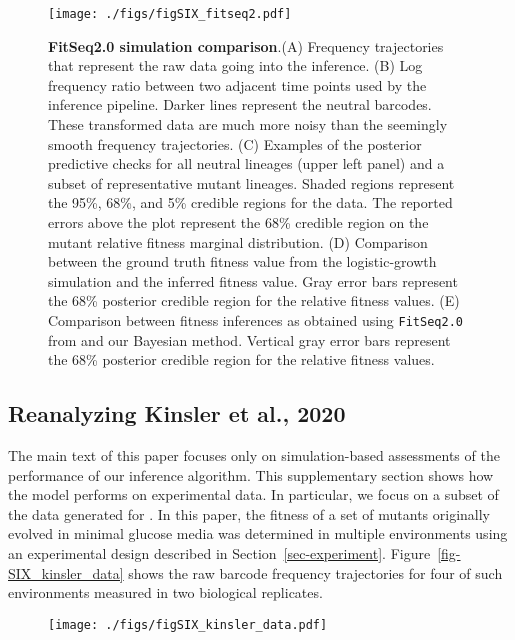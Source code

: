 \documentclass[
]{scrartcl}
\begin{document}
\begin{refsegment}
\begin{figure}
{\centering \texttt{[image: ./figs/figSIX\_fitseq2.pdf]}

}

\caption{\label{fig-SIX_fitseq2}\textbf{FitSeq2.0 simulation
comparison}.(A) Frequency trajectories that represent the raw data going
into the inference. (B) Log frequency ratio between two adjacent time
points used by the inference pipeline. Darker lines represent the
neutral barcodes. These transformed data are much more noisy than the
seemingly smooth frequency trajectories. (C) Examples of the posterior
predictive checks for all neutral lineages (upper left panel) and a
subset of representative mutant lineages. Shaded regions represent the
95\%, 68\%, and 5\% credible regions for the data. The reported errors
above the plot represent the 68\% credible region on the mutant relative
fitness marginal distribution. (D) Comparison between the ground truth
fitness value from the logistic-growth simulation and the inferred
fitness value. Gray error bars represent the 68\% posterior credible
region for the relative fitness values. (E) Comparison between fitness
inferences as obtained using \texttt{FitSeq2.0} from \textcite{li2023}
and our Bayesian method. Vertical gray error bars represent the 68\%
posterior credible region for the relative fitness values.}

\end{figure}

\hypertarget{sec-kinsler}{%
\subsection{Reanalyzing Kinsler et al., 2020}\label{sec-kinsler}}

The main text of this paper focuses only on simulation-based assessments
of the performance of our inference algorithm. This supplementary
section shows how the model performs on experimental data. In
particular, we focus on a subset of the data generated for
\autocite{kinsler2020}. In this paper, the fitness of a set of mutants
originally evolved in minimal glucose media was determined in multiple
environments using an experimental design described in
Section~\ref{sec-experiment}. Figure~\ref{fig-SIX_kinsler_data} shows
the raw barcode frequency trajectories for four of such environments
measured in two biological replicates.

\begin{figure}

{\centering \texttt{[image: ./figs/figSIX\_kinsler\_data.pdf]}

}
\end{figure}
\end{refsegment}
\end{document}
